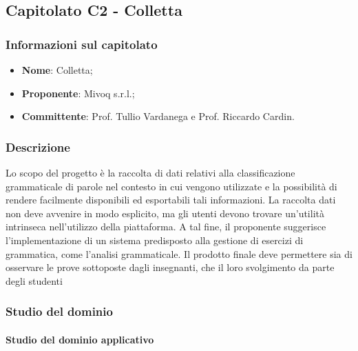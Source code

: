 \subsection{Capitolato C2 - Colletta}
\subsubsection{Informazioni sul capitolato}
\begin{itemize}
	\item \textbf{Nome}: Colletta;
	\item \textbf{Proponente}: Mivoq s.r.l.;
	\item \textbf{Committente}: Prof. Tullio Vardanega e Prof. Riccardo Cardin.
\end{itemize}
\subsubsection{Descrizione}
Lo scopo del progetto è la raccolta di dati relativi alla 
classificazione grammaticale di parole nel contesto in cui vengono utilizzate e 
la possibilità di rendere facilmente disponibili ed esportabili tali 
informazioni.
La raccolta dati non deve avvenire in modo esplicito, ma gli utenti 
devono trovare un'utilità intrinseca nell'utilizzo della piattaforma. A tal fine,
il proponente suggerisce l'implementazione di un sistema predisposto alla gestione
di esercizi di grammatica, come l'analisi grammaticale. Il prodotto finale deve 
permettere sia di osservare le prove sottoposte dagli insegnanti, che il loro 
svolgimento da parte degli studenti



 
\subsubsection{Studio del dominio}
\paragraph{Studio del dominio applicativo} \mbox{} \\ 

